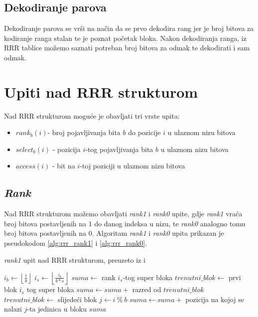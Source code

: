 \subsection{Dekodiranje parova}

Dekodiranje parova se vrši na način da se prvo dekodira rang jer je broj bitova za kodiranje ranga stalan te je poznat početak bloka. Nakon dekodiranja ranga, iz RRR tablice možemo saznati potreban broj bitova za odmak te dekodirati i sam odmak.

\section{Upiti nad RRR strukturom}

Nad RRR strukturom moguće je obavljati tri vrste upita:

\begin{itemize}
    \item $rank_b(i) $- broj pojavljivanja bita $b$ do pozicije $i$ u ulaznom nizu bitova
    \item $select_b(i)$ - pozicija $i$-tog pojavljivanja bita $b$ u ulaznom nizu bitova
    \item $access(i)$ - bit na $i$-toj poziciji u ulaznom nizu bitova
\end{itemize}

\subsection{\emph{Rank}}

Nad RRR strukturom možemo obavljati \emph{rank1} i \emph{rank0} upite, gdje \emph{rank1} vraća broj bitova postavljenih na $1$ do danog indeksa u nizu, te \emph{rank0} analogno tomu broj bitova postavljenih na $0$. Algoritam \emph{rank1} i \emph{rank0} upita prikazan je pseudokodom \ref{alg:rrr_rank1} i \ref{alg:rrr_rank0}.

\begin{algorithm}[H]
  \caption{\emph{rank1} upit nad RRR strukturom, preuzeto iz \cite{bowe-th} i \cite{breberic}}
  \begin{algorithmic}[1]
    \State $i_b \gets \left \lfloor \frac{i}{b} \right \rfloor$
    \State $i_s \gets \left \lfloor \frac{i_b}{b * s} \right \rfloor$
    \State $suma \gets $ rank $i_s$-tog super bloka
    \State $trenutni\_blok \gets $ prvi blok $i_s$ tog super bloka
      \State $suma \gets suma + $ razred od $trenutni\_blok$
      \State $trenutni\_blok \gets $ slijedeći blok
      \State $j \gets i \ \% \ b$
      \State $suma \gets suma + $ pozicija na kojoj se nalazi $j$-ta jedinica u bloku 
      \State{}
      \Return $suma$
    \EndWhile
    \EndFunction
  \end{algorithmic}
  \label{alg:rrr_rank1}
\end{algorithm}

